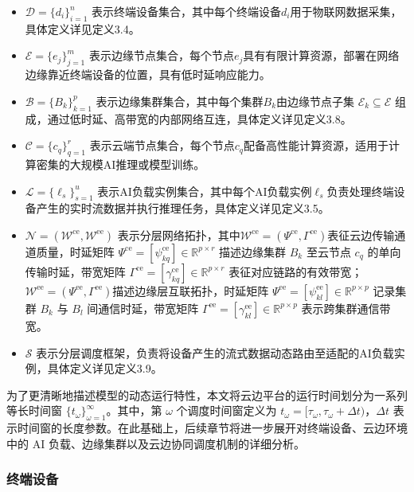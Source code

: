 \begin{itemize}
    \item $\mathcal{D} = \{d_i\}_{i=1}^n$ 表示终端设备集合，其中每个终端设备$d_i$用于物联网数据采集，具体定义详见定义3.4。
    \item $\mathcal{E} = \{e_j\}_{j=1}^m$ 表示边缘节点集合，每个节点$e_j$具有有限计算资源，部署在网络边缘靠近终端设备的位置，具有低时延响应能力。
    \item $\mathcal{B} = \{B_k\}_{k=1}^p$ 表示边缘集群集合，其中每个集群$B_k$由边缘节点子集 $\mathcal{E}_k \subseteq \mathcal{E}$ 组成，通过低时延、高带宽的内部网络互连，具体定义详见定义3.8。
    \item $\mathcal{C} = \{c_q\}_{q=1}^r$ 表示云端节点集合，每个节点$c_q$配备高性能计算资源，适用于计算密集的大规模AI推理或模型训练。
    \item $\mathcal{L} = \{\ell_s\}_{s=1}^u$ 表示AI负载实例集合，其中每个AI负载实例$\ell_s$负责处理终端设备产生的实时流数据并执行推理任务，具体定义详见定义3.5。
    \item $\mathcal{N} = (\mathcal{W}^{\mathrm{ce}}, \mathcal{W}^{\mathrm{ee}})$ 表示分层网络拓扑，其中$\mathcal{W}^{\mathrm{ce}} = (\Psi^{\mathrm{ce}}, \Gamma^{\mathrm{ce}})$表征云边传输通道质量，时延矩阵 $\Psi^{\mathrm{ce}} = [\psi^{\mathrm{ce}}_{kq}] \in \mathbb{R}^{p \times r}$ 描述边缘集群 $B_k$ 至云节点 $c_q$ 的单向传输时延，带宽矩阵 $\Gamma^{\mathrm{ce}} = [\gamma^{\mathrm{ce}}_{kq}] \in \mathbb{R}^{p \times r}$ 表征对应链路的有效带宽；$\mathcal{W}^{\mathrm{ee}} = (\Psi^{\mathrm{ee}}, \Gamma^{\mathrm{ee}})$描述边缘层互联拓扑，时延矩阵 $\Psi^{\mathrm{ee}} = [\psi^{\mathrm{ee}}_{kl}] \in \mathbb{R}^{p \times p}$ 记录集群 $B_k$ 与 $B_l$ 间通信时延，带宽矩阵 $\Gamma^{\mathrm{ee}} = [\gamma^{\mathrm{ee}}_{kl}] \in \mathbb{R}^{p \times p}$ 表示跨集群通信带宽。
    \item $\mathcal{S}$ 表示分层调度框架，负责将设备产生的流式数据动态路由至适配的AI负载实例，具体定义详见定义3.9。
\end{itemize}

为了更清晰地描述模型的动态运行特性，本文将云边平台的运行时间划分为一系列等长时间窗 $\{t_\omega\}_{\omega=1}^\infty$。其中，第 $\omega$ 个调度时间窗定义为 $t_\omega = [\tau_\omega, \tau_\omega + \Delta t)$，$\Delta t$ 表示时间窗的长度参数。在此基础上，后续章节将进一步展开对终端设备、云边环境中的 AI 负载、边缘集群以及云边协同调度机制的详细分析。

\subsubsection{终端设备}

